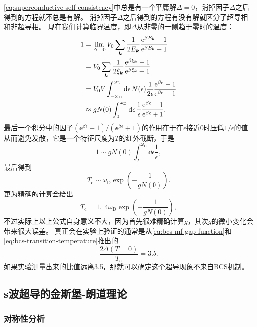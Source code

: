 \eqref{eq:superconductive-self-consistency}中总是有一个平庸解$\Delta = 0$，消掉因子$\Delta$之后得到的方程就不总是有解。
消掉因子$\Delta$之后得到的方程有没有解就区分了超导相和非超导相。
现在我们计算临界温度，即$\Delta$从非零的一侧趋于零时的温度：
\[
    \begin{aligned}
        1 &= \lim_{\Delta \to 0} V_0 \sum_{\vb*{k}} \frac{1}{2 E_{\vb*{k}}} \frac{\mathrm{e}^{\beta E_{\vb*{k}}} - 1}{\mathrm{e}^{\beta E_{\vb*{k}}} + 1} \\
        &= V_0 \sum_{\vb*{k}} \frac{1}{2 \xi_{\vb*{k}}} \frac{\mathrm{e}^{\beta \xi_{\vb*{k}}} - 1}{\mathrm{e}^{\beta \xi_{\vb*{k}}} + 1} \\
        &= V_0 V \int_{-\omega_\text{D}}^{\omega_\text{D}} \dd{\epsilon} N(\epsilon) \frac{1}{2 \epsilon} \frac{\mathrm{e}^{\beta \epsilon} - 1}{\mathrm{e}^{\beta \epsilon} + 1} \\
        &\approx g N(0) \int_{0}^{\omega_\text{D}} \dd{\epsilon} \frac{1}{\epsilon} \frac{\mathrm{e}^{\beta \epsilon} - 1}{\mathrm{e}^{\beta \epsilon} + 1}.
    \end{aligned}
\]
最后一个积分中的因子$(\ee^{\beta \epsilon} - 1) / (\ee^{\beta \epsilon} + 1)$的作用在于在$\epsilon$接近$0$时压低$1/\epsilon$的值从而避免发散，它是一个特征尺度为$T$的红外截断，于是
\[
    1 \sim g N(0) \int_{T}^{\omega_\text{D}} \dd{\epsilon} \frac{1}{\epsilon},
\]
最后得到
\begin{equation}
    T_\text{c} \sim \omega_\text{D} \exp \left( - \frac{1}{g N(0)} \right).
\end{equation}
更为精确的计算会给出
\begin{equation}
    T_\text{c} = 1.14 \omega_\text{D} \exp \left( - \frac{1}{g N(0)} \right),
    \label{eq:bcs-transition-temperature}
\end{equation}
不过实际上以上公式自身意义不大，因为首先很难精确计算$g$，其次$g$的微小变化会带来很大误差。
真正会在实验上验证的通常是从\eqref{eq:bcs-mf-gap-function}和\eqref{eq:bcs-transition-temperature}推出的
\begin{equation}
    \frac{2 \Delta(T=0)}{T_\text{c}} = 3.5.
\end{equation}
如果实验测量出来的比值远离3.5，那就可以确定这个超导现象不来自BCS机制。

\subsection{s波超导的金斯堡-朗道理论}\label{sec:superconductivity-gl}

\subsubsection{对称性分析}

